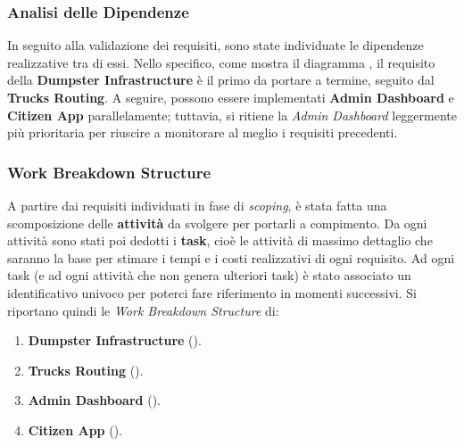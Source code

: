 \subsubsection{Analisi delle Dipendenze}
In seguito alla validazione dei requisiti, sono state individuate le dipendenze realizzative tra di essi. Nello specifico, come mostra il diagramma , il requisito della \textbf{Dumpster Infrastructure} è il primo da portare a termine, seguito dal \textbf{Trucks Routing}. A seguire, possono essere implementati \textbf{Admin Dashboard} e \textbf{Citizen App} parallelamente; tuttavia, si ritiene la \textit{Admin Dashboard} leggermente più prioritaria per riuscire a monitorare al meglio i requisiti precedenti.

\subsubsection{Work Breakdown Structure}
A partire dai requisiti individuati in fase di \textit{scoping}, è stata fatta una scomposizione delle \textbf{attività} da svolgere per portarli a compimento.
Da ogni attività sono stati poi dedotti i \textbf{task}, cioè le attività di massimo dettaglio che saranno la base per stimare i tempi e i costi realizzativi di ogni requisito.
Ad ogni task (e ad ogni attività che non genera ulteriori task) è stato associato un identificativo univoco per poterci fare riferimento in momenti successivi.
Si riportano quindi le \textit{Work Breakdown Structure} di:
\begin{enumerate}
    \item \textbf{Dumpster Infrastructure} ().
    \item \textbf{Trucks Routing} ().
    \item \textbf{Admin Dashboard} ().
    \item \textbf{Citizen App} ().
\end{enumerate}


